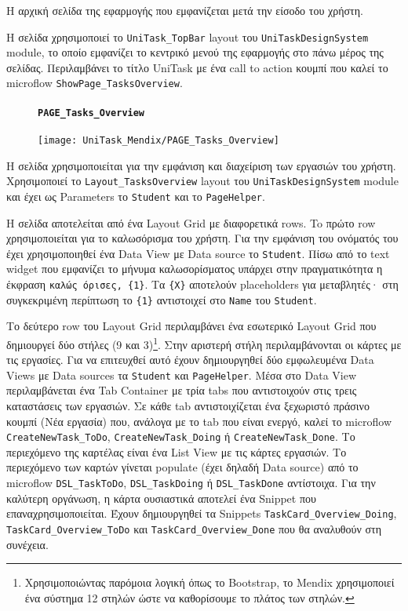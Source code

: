                 Η αρχική σελίδα της εφαρμογής που εμφανίζεται μετά την είσοδο του χρήστη.

                Η σελίδα χρησιμοποιεί το \texttt{UniTask\_TopBar} layout του \texttt{UniTaskDesignSystem} module, το οποίο εμφανίζει το κεντρικό μενού της εφαρμογής στο πάνω μέρος της σελίδας. Περιλαμβάνει το τίτλο {\ZonaSB UniTask} με ένα call to action κουμπί που καλεί το microflow \texttt{ShowPage\_TasksOverview}.

                \begin{figure}[H] \noindent
                    \paragraph{\texttt{PAGE\_Tasks\_Overview}}
                    \begin{center}
                        \texttt{[image: UniTask\_Mendix/PAGE\_Tasks\_Overview]}
                    \end{center}
                \end{figure}

                Η σελίδα χρησιμοποιείται για την εμφάνιση και διαχείριση των εργασιών του χρήστη. Χρησιμοποιεί το \texttt{Layout\_TasksOverview} layout του \texttt{UniTaskDesignSystem} module και έχει ως Parameters το \texttt{Student} και το \texttt{PageHelper}.

                Η σελίδα αποτελείται από ένα Layout Grid με διαφορετικά rows. To πρώτο row χρησιμοποιείται για το καλωσόρισμα του χρήστη. Για την εμφάνιση του ονόματός του έχει χρησιμοποιηθεί ένα Data View με Data source το \texttt{Student}. Πίσω από το text widget που εμφανίζει το μήνυμα καλωσορίσματος υπάρχει στην πραγματικότητα η έκφραση \verb|καλώς όρισες, {1}|. Τα \verb|{X}| αποτελούν placeholders για μεταβλητές· στη συγκεκριμένη περίπτωση το \verb|{1}| αντιστοιχεί στο \texttt{Name} του \texttt{Student}.

                Το δεύτερο row του Layout Grid περιλαμβάνει ένα εσωτερικό Layout Grid που δημιουργεί δύο στήλες (9 και 3)\footnote{Χρησιμοποιώντας παρόμοια λογική όπως το Bootstrap, το Mendix χρησιμοποιεί ένα σύστημα 12 στηλών ώστε να καθορίσουμε το πλάτος των στηλών.}. Στην αριστερή στήλη περιλαμβάνονται οι κάρτες με τις εργασίες. Για να επιτευχθεί αυτό έχουν δημιουργηθεί δύο εμφωλευμένα Data Views με Data sources τα \texttt{Student} και \texttt{PageHelper}. Μέσα στο Data View περιλαμβάνεται ένα Tab Container με τρία tabs που αντιστοιχούν στις τρεις καταστάσεις των εργασιών. Σε κάθε tab αντιστοιχίζεται ένα ξεχωριστό πράσινο κουμπί ({\Zona Νέα εργασία}) που, ανάλογα με το tab που είναι ενεργό, καλεί το microflow \texttt{CreateNewTask\_ToDo}, \texttt{CreateNewTask\_Doing} ή \texttt{CreateNewTask\_Done}. Το περιεχόμενο της καρτέλας είναι ένα List View με τις κάρτες εργασιών. Το περιεχόμενο των καρτών γίνεται populate (έχει δηλαδή Data source) από το microflow \texttt{DSL\_TaskToDo}, \texttt{DSL\_TaskDoing} ή \texttt{DSL\_TaskDone} αντίστοιχα. Για την καλύτερη οργάνωση, η κάρτα ουσιαστικά αποτελεί ένα Snippet που επαναχρησιμοποιείται. Έχουν δημιουργηθεί τα Snippets \texttt{TaskCard\_Overview\_Doing}, \texttt{TaskCard\_Overview\_ToDo} και \texttt{TaskCard\_Overview\_Done} που θα αναλυθούν στη συνέχεια.

